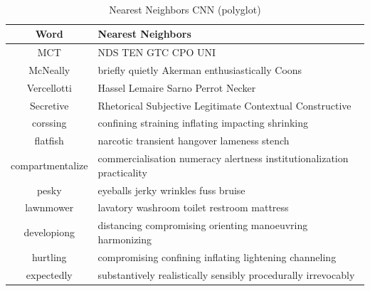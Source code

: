         \begin{table}[!ht]
          \begin{center}
            \caption{Nearest Neighbors CNN (polyglot)}
            ~\\
            \label{tab:nearest:cnn-polyglot}
            \begin{tabular}{c|l}
              \textbf{Word} & \textbf{Nearest Neighbors}\\
              \hline
              MCT & \multicolumn{1}{p{0.7\textwidth}}{NDS TEN GTC CPO UNI}\\
              McNeally & \multicolumn{1}{p{0.7\textwidth}}{briefly quietly Akerman enthusiastically Coons}\\
              Vercellotti & \multicolumn{1}{p{0.7\textwidth}}{Hassel Lemaire Sarno Perrot Necker}\\
              Secretive & \multicolumn{1}{p{0.7\textwidth}}{Rhetorical Subjective Legitimate Contextual Constructive}\\
              corssing & \multicolumn{1}{p{0.7\textwidth}}{confining straining inflating impacting shrinking}\\
              flatfish & \multicolumn{1}{p{0.7\textwidth}}{narcotic transient hangover lameness stench}\\
              compartmentalize & \multicolumn{1}{p{0.7\textwidth}}{commercialisation numeracy alertness institutionalization practicality}\\
              pesky & \multicolumn{1}{p{0.7\textwidth}}{eyeballs jerky wrinkles fuss bruise}\\
              lawnmower & \multicolumn{1}{p{0.7\textwidth}}{lavatory washroom toilet restroom mattress}\\
              developiong & \multicolumn{1}{p{0.7\textwidth}}{distancing compromising orienting manoeuvring harmonizing}\\
              hurtling & \multicolumn{1}{p{0.7\textwidth}}{compromising confining inflating lightening channeling}\\
              expectedly & \multicolumn{1}{p{0.7\textwidth}}{substantively realistically sensibly procedurally irrevocably}\\
            \end{tabular}
          \end{center}
        \end{table}


